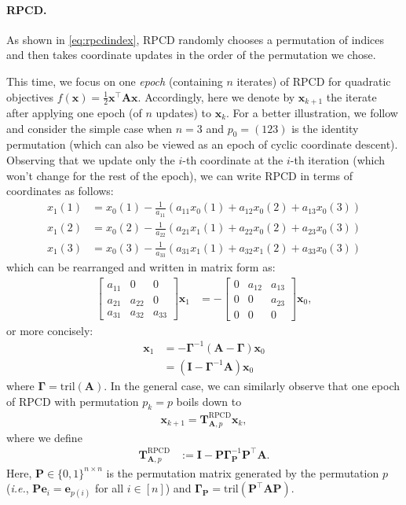 \documentclass{article}
\theoremstyle{plain}
\theoremstyle{definition}
\theoremstyle{remark}
\def\bigopen#1{\left(#1\right)}
\newcommand{\tril}{\mathrm{tril}}
\newcommand{\mGamma}{\bm{\Gamma}}
\def\ve{{\bm{e}}}
\def\vx{{\bm{x}}}
\def\mA{{\bm{A}}}
\def\mD{{\bm{D}}}
\def\mI{{\bm{I}}}
\def\mP{{\bm{P}}}
\def\mT{{\bm{T}}}
\begin{document}
\paragraph{RPCD.} As shown in \cref{eq:rpcdindex}, RPCD randomly chooses a permutation of indices and then takes coordinate updates in the order of the permutation we chose.

This time, we focus on one \emph{epoch} (containing $n$ iterates) of RPCD for quadratic objectives $f(\vx) = \frac{1}{2} \vx^{\top} \mA \vx$.
Accordingly, here we denote by $\vx_{k+1}$ the iterate after applying one epoch (of $n$ updates) to $\vx_{k}$.
For a better illustration, we follow \citet{sun20} and consider the simple case when $n = 3$ and $p_0 = (123)$ is the identity permutation (which can also be viewed as an epoch of cyclic coordinate descent).
Observing that we update only the $i$-th coordinate at the $i$-th iteration (which won't change for the rest of the epoch), we can write RPCD in terms of coordinates as follows:
\begin{align*}
    x_{1} (1) &= x_{0} (1) - \tfrac{1}{a_{11}} \bigopen{a_{11} x_{0} (1) + a_{12} x_{0} (2) + a_{13} x_{0} (3)} \\
    x_{1} (2) &= x_{0} (2) - \tfrac{1}{a_{22}} \bigopen{a_{21} x_{1} (1) + a_{22} x_{0} (2) + a_{23} x_{0} (3)} \\
    x_{1} (3) &= x_{0} (3) - \tfrac{1}{a_{33}} \bigopen{a_{31} x_{1} (1) + a_{32} x_{1} (2) + a_{33} x_{0} (3)}
\end{align*}
which can be rearranged and written in matrix form as:
\begin{align*}
    \begin{bmatrix}
        a_{11} & 0 & 0 \\ a_{21} & a_{22} & 0 \\ a_{31} & a_{32} & a_{33}
    \end{bmatrix} \vx_1 &= - \begin{bmatrix}
        0 & a_{12} & a_{13} \\ 0 & 0 & a_{23} \\ 0 & 0 & 0
    \end{bmatrix} \vx_0,
\end{align*}
or more concisely:
\begin{align*}
    \vx_1 &= - \mGamma^{-1} (\mA - \mGamma) \vx_0 \\
    &= (\mI - \mGamma^{-1} \mA) \vx_0
\end{align*}
where $\mGamma = \tril(\mA)$. %
In the general case, we can similarly observe that one epoch of RPCD with permutation $p_k = p$ boils down to
\begin{align*}
    \vx_{k+1} = \mT_{\mA, p}^{\text{RPCD}} \vx_{k},
\end{align*}
where we define 
\begin{align}
    \mT_{\mA, p}^{\text{RPCD}} &:= \mI - \mP \mGamma_{\mP}^{-1} \mP^{\top} \mA. \label{eq:rpcdmatrix}
\end{align}
Here, $\mP \in \{0, 1\}^{n \times n}$ is the permutation matrix generated by the permutation $p$ ({\it i.e.}, $\mP \ve_i = \ve_{p(i)}$ for all $i\in [n]$) and $\mGamma_{\mP} = \tril(\mP^{\top} \mA \mP)$.
\end{document}
